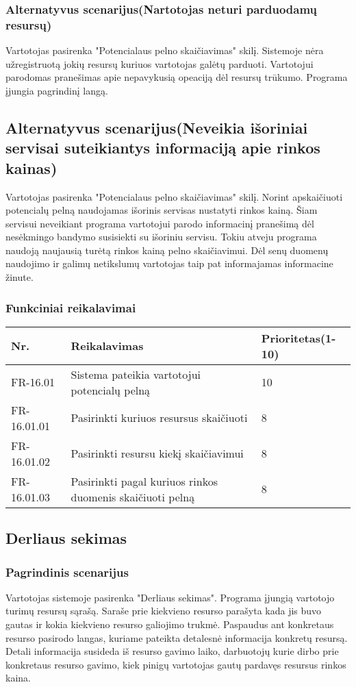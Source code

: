 \documentclass[oneside]{VUMIFPSkursinis}
\begin{document}
	\subsubsection{Alternatyvus scenarijus(Nartotojas neturi parduodamų resursų)}
	Vartotojas pasirenka "Potencialaus pelno skaičiavimas" skilį. Sistemoje nėra užregistruotą jokių resursų kuriuos vartotojas galėtų parduoti. Vartotojui parodomas pranešimas apie nepavykusią opeaciją dėl resursų trūkumo. Programa įjungia pagrindinį langą. 
	\subsection{Alternatyvus scenarijus(Neveikia išoriniai servisai suteikiantys informaciją apie rinkos kainas)}
	Vartotojas pasirenka "Potencialaus pelno skaičiavimas" skilį. Norint apskaičiuoti potencialų pelną naudojamas išorinis servisas nustatyti rinkos kainą. Šiam servisui neveikiant programa vartotojui parodo informacinį pranešimą dėl nesėkmingo bandymo susisiekti su išoriniu servisu. Tokiu atveju programa naudoją naujausią turėtą rinkos kainą pelno skaičiavimui. Dėl senų duomenų naudojimo ir galimų netikslumų vartotojas taip pat informajamas informacine žinute.
	\subsubsection{Funkciniai reikalavimai}
\begin{table}[htbp]
	\begin{tabularx}{1\textwidth}{ |P{2.5cm}|X|P{3cm }| }  \hline
		Nr. & Reikalavimas & Prioritetas(1-10) \\ \hline
		FR-16.01 & Sistema pateikia vartotojui potencialų pelną & 10 \\ \hline
		FR-16.01.01 & Pasirinkti kuriuos resursus skaičiuoti & 8 \\ \hline
		FR-16.01.02 & Pasirinkti resursu kiekį skaičiavimui & 8 \\ \hline
		FR-16.01.03 & Pasirinkti pagal kuriuos rinkos duomenis skaičiuoti pelną & 8 \\ \hline
	\end{tabularx}
\end{table}	
\subsection{Derliaus sekimas}
	\subsubsection{Pagrindinis scenarijus}
	Vartotojas sistemoje pasirenka "Derliaus sekimas". Programa įjungią vartotojo turimų resursų sąrašą. Saraše prie kiekvieno resurso parašyta kada jis buvo gautas ir kokia kiekvieno resurso galiojimo trukmė. Paspaudus ant konkretaus resurso pasirodo langas, kuriame pateikta detalesnė informacija konkretų resursą. Detali informacija susideda iš resurso gavimo laiko, darbuotojų kurie dirbo prie konkretaus resurso gavimo, kiek pinigų vartotojas gautų pardavęs resursus rinkos kaina.
\end{document}
